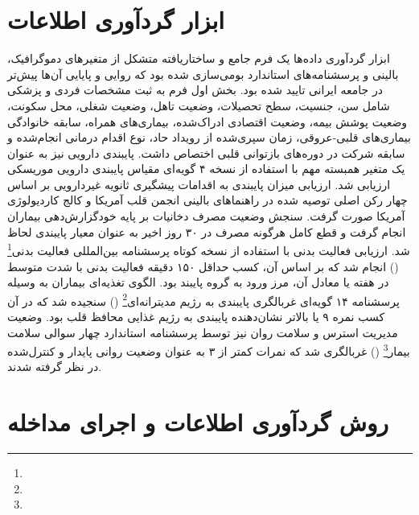 \section{ابزار گردآوری اطلاعات}
\label{sec:instruments}


ابزار گردآوری داده‌ها یک فرم جامع و ساختاریافته متشکل از متغیرهای دموگرافیک، بالینی و پرسشنامه‌های استاندارد بومی‌سازی شده بود که روایی و پایایی آن‌ها پیش‌تر در جامعه ایرانی تایید شده بود\cite{Bazzazian2010BriefIPQ,Mehrabi2023Morisky,MahdaviRoshan2018MEDAS,KarimiGhasemabad2021BriefIPQ,VasheghaniFarahani2011IPAQ}. بخش اول فرم به ثبت مشخصات فردی و پزشکی شامل سن، جنسیت، سطح تحصیلات، وضعیت تاهل، وضعیت شغلی، محل سکونت، وضعیت پوشش بیمه، وضعیت اقتصادی ادراک‌شده، بیماری‌های همراه، سابقه خانوادگی بیماری‌های قلبی-عروقی، زمان سپری‌شده از رویداد حاد، نوع اقدام درمانی انجام‌شده و سابقه شرکت در دوره‌های بازتوانی قلبی اختصاص داشت. پایبندی دارویی نیز به عنوان یک متغیر همبسته مهم با استفاده از نسخه ۴ گویه‌ای مقیاس پایبندی دارویی موریسکی ارزیابی شد\cite{Mehrabi2023Morisky}. ارزیابی میزان پایبندی به اقدامات پیشگیری ثانویه غیردارویی بر اساس چهار رکن اصلی توصیه شده در راهنماهای بالینی انجمن قلب آمریکا و کالج کاردیولوژی آمریکا صورت گرفت\cite{Rao2025ACS,Smith2011SecondaryPrevention}. سنجش وضعیت مصرف دخانیات بر پایه خودگزارش‌دهی بیماران انجام گرفت و قطع کامل هرگونه مصرف در ۳۰ روز اخیر به عنوان معیار پایبندی لحاظ شد\cite{Smith2011SecondaryPrevention,Hayrumyan2023SmokingCessation,Yudi2017SmokingCessation}. ارزیابی فعالیت بدنی با استفاده از نسخه کوتاه پرسشنامه بین‌المللی فعالیت بدنی\footnote{} () انجام شد که بر اساس آن، کسب حداقل ۱۵۰ دقیقه فعالیت بدنی با شدت متوسط در هفته یا معادل آن، مرز ورود به گروه پایبند بود\cite{VasheghaniFarahani2011IPAQ,Smith2011SecondaryPrevention}. الگوی تغذیه‌ای بیماران به وسیله پرسشنامه ۱۴ گویه‌ای غربالگری پایبندی به رژیم مدیترانه‌ای\footnote{} () سنجیده شد که در آن کسب نمره ۹ یا بالاتر نشان‌دهنده پایبندی به رژیم غذایی محافظ قلب بود\cite{MahdaviRoshan2018MEDAS,HutchinsWiese2022Mediterranean}. وضعیت مدیریت استرس و سلامت روان نیز توسط پرسشنامه استاندارد چهار سوالی سلامت بیمار\footnote{} () غربالگری شد که نمرات کمتر از ۳ به عنوان وضعیت روانی پایدار و کنترل‌شده در نظر گرفته شدند\cite{Dadfar2025PHQ4,Ahmadi2020PHQ4,Ghaheri2020PHQ4}.



\section{روش گردآوری اطلاعات و اجرای مداخله}
\label{sec:procedure}


